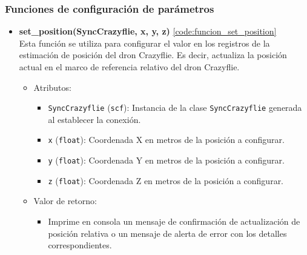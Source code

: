 \subsubsection{Funciones de configuración de parámetros}
\begin{itemize}
	\item \textbf{set\_position(SyncCrazyflie, x, y, z)} \ref{code:funcion_set_position}\\ 
	Esta función se utiliza para configurar el valor en los registros de la estimación de posición del dron Crazyflie. Es decir, actualiza la posición actual en el marco de referencia relativo del dron Crazyflie.
	\begin{itemize}
		\item Atributos:
		\begin{itemize}
			\item \texttt{SyncCrazyflie} (\texttt{scf}): Instancia de la clase \texttt{SyncCrazyflie} generada al establecer la conexión.
			\item \texttt{x} (\texttt{float}): Coordenada X en metros de la posición a configurar.
			\item \texttt{y} (\texttt{float}): Coordenada Y en metros de la posición a configurar.
			\item \texttt{z} (\texttt{float}): Coordenada Z en metros de la posición a configurar.
		\end{itemize}
		\item Valor de retorno:
		\begin{itemize}
			\item Imprime en consola un mensaje de confirmación de actualización de posición relativa o un mensaje de alerta de error con los detalles correspondientes.
		\end{itemize}
	\end{itemize} 
	\vspace{1mm} %
	

\end{itemize}
